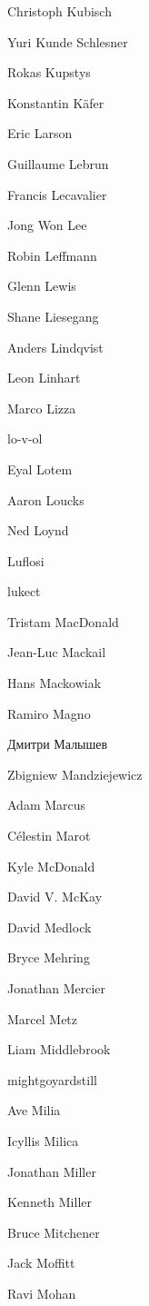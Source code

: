 \begin{DoxyItemize}
\item Christoph Kubisch
\item Yuri Kunde Schlesner
\item Rokas Kupstys
\item Konstantin Käfer
\item Eric Larson
\item Guillaume Lebrun
\item Francis Lecavalier
\item Jong Won Lee
\item Robin Leffmann
\item Glenn Lewis
\item Shane Liesegang
\item Anders Lindqvist
\item Leon Linhart
\item Marco Lizza
\item lo-\/v-\/ol
\item Eyal Lotem
\item Aaron Loucks
\item Ned Loynd
\item Luflosi
\item lukect
\item Tristam Mac\+Donald
\item Jean-\/\+Luc Mackail
\item Hans Mackowiak
\item Ramiro Magno
\item Дмитри Малышев
\item Zbigniew Mandziejewicz
\item Adam Marcus
\item Célestin Marot
\item Kyle Mc\+Donald
\item David V. Mc\+Kay
\item David Medlock
\item Bryce Mehring
\item Jonathan Mercier
\item Marcel Metz
\item Liam Middlebrook
\item mightgoyardstill
\item Ave Milia
\item Icyllis Milica
\item Jonathan Miller
\item Kenneth Miller
\item Bruce Mitchener
\item Jack Moffitt
\item Ravi Mohan

\end{DoxyItemize}
